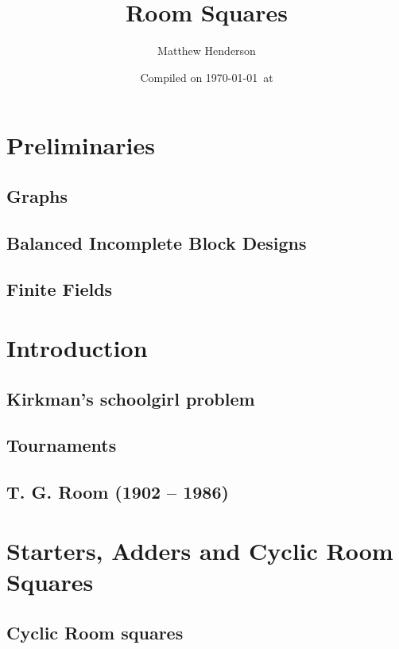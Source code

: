 \documentclass[a4paper, draft]{book}
\title{Room Squares}
\author{Matthew Henderson}
\date{Compiled on \today\ at \currenttime}
\begin{document}
\frontmatter
\maketitle
\tableofcontents

\mainmatter

\chapter{Preliminaries}
  \label{ch:preliminaries}
  \section{Graphs}
    \label{sec:graph}
    
  \section{Balanced Incomplete Block Designs}
    \label{sec:bibd}
    
  \section{Finite Fields}
    \label{sec:galois-field}
    

\chapter{Introduction}
  \label{ch:introduction}
  \section{Kirkman’s schoolgirl problem}
    
  \section{Tournaments}
    
  \section{T. G. Room (1902 -- 1986)}
    

\chapter{Starters, Adders and Cyclic Room Squares}
  \label{ch:starter-adder}
  \section{Cyclic Room squares}
    
\end{document}
